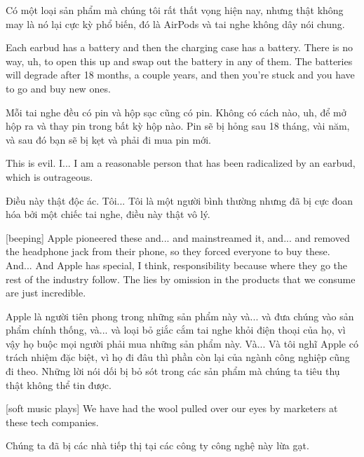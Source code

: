 \documentclass[a4paper]{article}
\begin{document}
	\begin{vietnamese-v2}
		Có một loại sản phẩm mà chúng tôi rất thất vọng hiện nay, nhưng thật không may là nó lại cực kỳ phổ biến, đó là AirPods và tai nghe không dây nói chung.
	\end{vietnamese-v2}
	
	Each earbud has a battery and then the charging case has a battery.
	There is no way, uh, to open this up and swap out the battery in any of them.
	The batteries will degrade after 18 months, a couple years, and then you're stuck and you have to go and buy new ones.
	
	\begin{vietnamese-v2}
		Mỗi tai nghe đều có pin và hộp sạc cũng có pin.
		Không có cách nào, uh, để mở hộp ra và thay pin trong bất kỳ hộp nào.
		Pin sẽ bị hỏng sau 18 tháng, vài năm, và sau đó bạn sẽ bị kẹt và phải đi mua pin mới.
	\end{vietnamese-v2}
	
	
	This is evil.
	I... I am a reasonable person that has been radicalized by an earbud, which is outrageous.
	
	\begin{vietnamese-v2}
		Điều này thật độc ác.
		Tôi... Tôi là một người bình thường nhưng đã bị cực đoan hóa bởi một chiếc tai nghe, điều này thật vô lý.
	\end{vietnamese-v2}
	
	
	[beeping]
	Apple pioneered these and... and mainstreamed it, and... and removed the headphone jack from their phone, so they forced everyone to buy these.
	And... And Apple has special, I think, responsibility because where they go the rest of the industry follow.
	The lies by omission in the products that we consume are just incredible.
	
	\begin{vietnamese-v2}
		[bíp]
		Apple là người tiên phong trong những sản phẩm này và... và đưa chúng vào sản phẩm chính thống, và... và loại bỏ giắc cắm tai nghe khỏi điện thoại của họ, vì vậy họ buộc mọi người phải mua những sản phẩm này.
		Và... Và tôi nghĩ Apple có trách nhiệm đặc biệt, vì họ đi đâu thì phần còn lại của ngành công nghiệp cũng đi theo.
		Những lời nói dối bị bỏ sót trong các sản phẩm mà chúng ta tiêu thụ thật không thể tin được.
	\end{vietnamese-v2}
	
	[soft music plays]
	We have had the wool pulled over our eyes by marketers at these tech companies.
	
	\begin{vietnamese-v2}
		Chúng ta đã bị các nhà tiếp thị tại các công ty công nghệ này lừa gạt.
	\end{vietnamese-v2}
	
\end{document}
